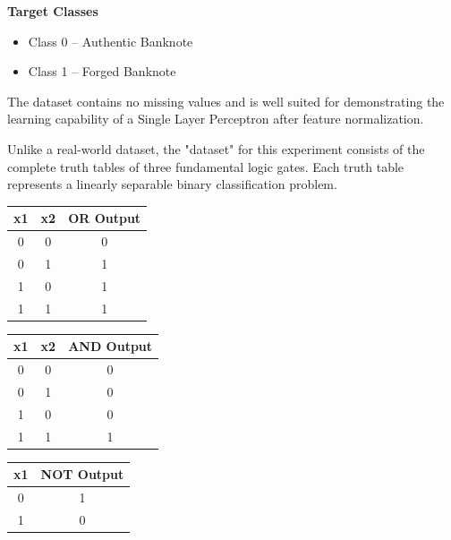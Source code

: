 \documentclass[11pt,a4paper]{article}
\begin{document}
\vspace{0.3cm}

\textbf{Target Classes}

\begin{itemize}
\item Class 0 -- Authentic Banknote
\item Class 1 -- Forged Banknote
\end{itemize}

The dataset contains no missing values and is well suited for demonstrating the learning capability of a Single Layer Perceptron after feature normalization.
 





Unlike a real-world dataset, the "dataset" for this experiment consists of the complete truth tables of three fundamental logic gates. Each truth table represents a linearly separable binary classification problem.

\vspace{0.2cm}

\begin{center}
\begin{tabular}{|c|c|c|}
\hline
\textbf{x1} & \textbf{x2} & \textbf{OR Output}\\
\hline
0 & 0 & 0\\
0 & 1 & 1\\
1 & 0 & 1\\
1 & 1 & 1\\
\hline
\end{tabular}
\qquad
\begin{tabular}{|c|c|c|}
\hline
\textbf{x1} & \textbf{x2} & \textbf{AND Output}\\
\hline
0 & 0 & 0\\
0 & 1 & 0\\
1 & 0 & 0\\
1 & 1 & 1\\
\hline
\end{tabular}
\qquad
\begin{tabular}{|c|c|}
\hline
\textbf{x1} & \textbf{NOT Output}\\
\hline
0 & 1\\
1 & 0\\
\hline
\end{tabular}
\end{center}

\vspace{0.2cm}
\end{document}
